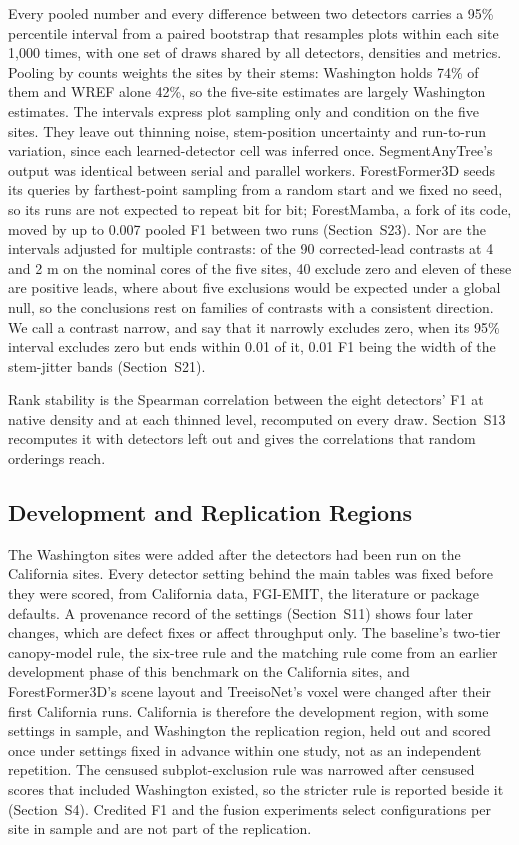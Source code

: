 \documentclass[journal]{IEEEtran}
\begin{document}
Every pooled number and every difference between two detectors carries a 95\%
percentile interval from a paired bootstrap that resamples plots within each
site 1,000 times, with one set of draws shared by all detectors, densities and
metrics. Pooling by counts weights the sites by their stems: Washington holds
74\% of them and WREF alone 42\%, so the five-site estimates are largely
Washington estimates. The intervals express plot sampling only and condition on
the five sites. They leave out thinning noise, stem-position uncertainty and
run-to-run variation, since each learned-detector cell was inferred once.
SegmentAnyTree's output was identical between serial and parallel workers.
ForestFormer3D seeds its queries by farthest-point sampling from a random start
and we fixed no seed, so its runs are not expected to repeat bit for bit;
ForestMamba, a fork of its code, moved by up to 0.007 pooled F1 between two runs
(Section~S23). Nor are the intervals adjusted for multiple contrasts: of the 90
corrected-lead contrasts at 4 and 2 m on the nominal cores of the five sites, 40
exclude zero and eleven of these are positive leads, where about five exclusions
would be expected under a global null, so the conclusions rest on families of
contrasts with a consistent direction. We call a contrast narrow, and say that
it narrowly excludes zero, when its 95\% interval excludes zero but ends within
0.01 of it, 0.01 F1 being the width of the stem-jitter bands (Section~S21).

Rank stability is the Spearman correlation between the eight detectors' F1 at
native density and at each thinned level, recomputed on every draw. Section~S13
recomputes it with detectors left out and gives the correlations that random
orderings reach.

\subsection{Development and Replication Regions}\label{sec:4.5}

The Washington sites were added after the detectors had been run on the
California sites. Every detector setting behind the main tables was fixed before
they were scored, from California data, FGI-EMIT, the literature or package
defaults. A provenance record of the settings (Section~S11) shows four later
changes, which are defect fixes or affect throughput only. The baseline's
two-tier canopy-model rule, the six-tree rule and the matching rule come from an
earlier development phase of this benchmark on the California sites, and
ForestFormer3D's scene layout and TreeisoNet's voxel were changed after their
first California runs. California is therefore the development region, with some
settings in sample, and Washington the replication region, held out and scored
once under settings fixed in advance within one study, not as an independent
repetition. The censused subplot-exclusion rule was narrowed after censused
scores that included Washington existed, so the stricter rule is reported beside
it (Section~S4). Credited F1 and the fusion experiments select configurations
per site in sample and are not part of the replication.
\end{document}
